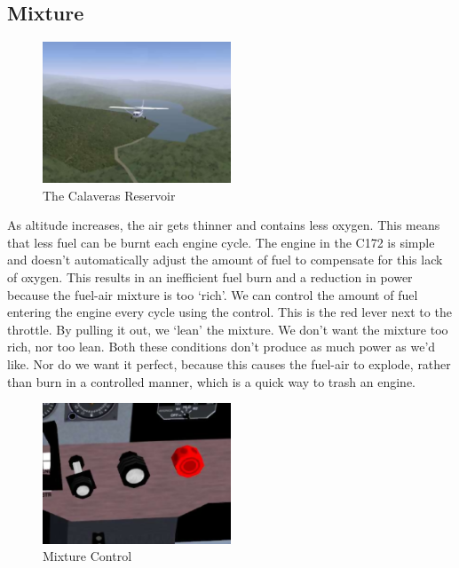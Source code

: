 \subsection{Mixture}

\begin{figure}[!htp]
\centering
\includegraphics[width=0.5\textwidth]{calaveras2}
\caption{The Calaveras Reservoir}
\end{figure}

As altitude increases, the air gets thinner and contains less oxygen.
This means that less fuel can be burnt each engine cycle. 
The engine in the C172 is simple and doesn't automatically 
adjust the amount of fuel to compensate for this lack of oxygen. 
This results in an inefficient fuel burn and a reduction in power 
because the fuel-air mixture is too `rich'. We can control the 
amount of fuel entering the engine every cycle using the  control. 
This is the red lever next to the throttle. By pulling it out, we `lean' 
the mixture. We don't want the mixture too rich, nor too lean. 
Both these conditions don't produce as much power as we'd like. 
Nor do we want it perfect, because this causes the fuel-air to explode, 
rather than burn in a controlled manner, which is a quick way to trash an engine.

\begin{figure}[!htp]
\centering
\includegraphics[width=0.5\textwidth]{mixture}
\caption{Mixture Control\label{mixture}}
\end{figure}

